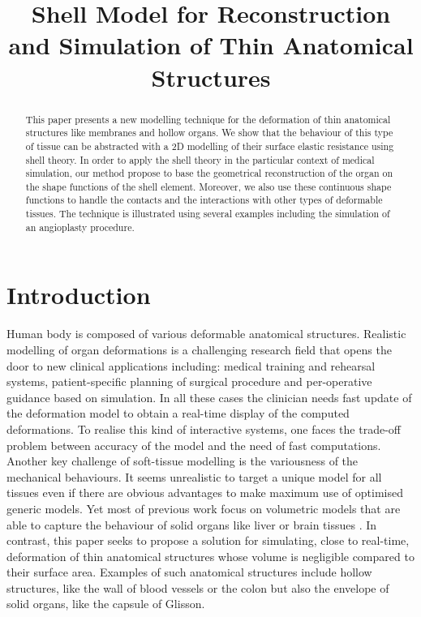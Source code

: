\documentclass{llncs}
\newcommand{\CD}[1]{{\color{magenta}{\textbf{CD: #1}}}}
\begin{document}
\title{Shell Model for Reconstruction and Simulation of Thin Anatomical Structures}

\maketitle

\begin{abstract}
This paper presents a new modelling technique for the deformation of thin anatomical structures like membranes and hollow organs. We show that the behaviour of this type of tissue can be abstracted with a 2D modelling of their surface elastic resistance using shell theory. In order to apply the shell theory in the particular context of medical simulation, our method propose to base the geometrical reconstruction of the organ on the shape functions of the shell element. Moreover, we also use these continuous shape functions to handle the contacts and the interactions with other types of deformable tissues. The technique is illustrated using several examples including the simulation of an angioplasty procedure.
\end{abstract}

\section{Introduction}

Human body is composed of various deformable anatomical structures. Realistic modelling of organ deformations is a challenging research field that opens the door to new clinical applications including: medical training and rehearsal systems, patient-specific planning of surgical procedure and per-operative guidance based on simulation. In all these cases the clinician needs fast update of the deformation model to obtain a real-time display of the computed deformations. To realise this kind of interactive systems, one faces the trade-off problem between accuracy of the model and the need of fast computations. 
Another key challenge of soft-tissue modelling is the variousness of the mechanical behaviours. It seems unrealistic to target a unique model for all tissues even if there are obvious advantages to make maximum use of optimised generic models. Yet most of previous work focus on volumetric models that are able to capture the behaviour of solid organs like liver \cite{} or brain tissues \cite{} \CD{TODO: biblio}. In contrast, this paper seeks to propose a solution for simulating, close to real-time, deformation of thin anatomical structures whose volume is negligible compared to their surface area. Examples of such anatomical structures include hollow structures, like the wall of blood vessels or the colon but also the envelope of solid organs, like the capsule of Glisson.
\end{document}
